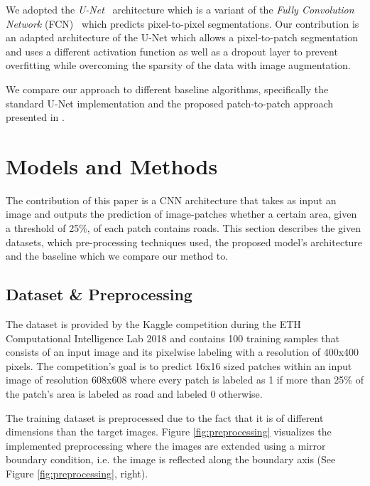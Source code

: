 \documentclass[10pt,conference,compsocconf]{IEEEtran}
\begin{document}
We adopted the \textit{U-Net}~\cite{Ronneberger2015} architecture which is a variant of the \textit{Fully Convolution Network} (FCN)~\cite{Long2014} which predicts pixel-to-pixel segmentations. Our contribution is an adapted architecture of the U-Net which allows a pixel-to-patch segmentation and uses a different activation function as well as a dropout layer to prevent overfitting while overcoming the sparsity of the data with image augmentation.

We compare our approach to different baseline algorithms, specifically the standard U-Net implementation and the proposed patch-to-patch approach presented in \cite{Pavllo2017}.

\section{Models and Methods}

The contribution of this paper is a CNN architecture that takes as input an image and outputs the prediction of image-patches whether a certain area, given a threshold of 25\%, of each patch contains roads. This section describes the given datasets, which pre-processing techniques used, the proposed model’s architecture and the baseline which we compare our method to.

\subsection{Dataset \& Preprocessing}

The dataset is provided by the Kaggle competition during the ETH Computational Intelligence Lab 2018 \cite{KaggleCompetition} and contains 100 training samples that consists of an input image and its pixelwise labeling with a resolution of 400x400 pixels. The competition’s goal is to predict 16x16 sized patches within an input image of resolution 608x608 where every patch is labeled as 1 if more than 25\% of the patch’s area is labeled as road and labeled 0 otherwise.

The training dataset is preprocessed due to the fact that it is of different dimensions than the target images. Figure \ref{fig:preprocessing} visualizes the implemented preprocessing where the images are extended using a mirror boundary condition, i.e. the image is reflected along the boundary axis (See Figure \ref{fig:preprocessing}, right).
\end{document}
